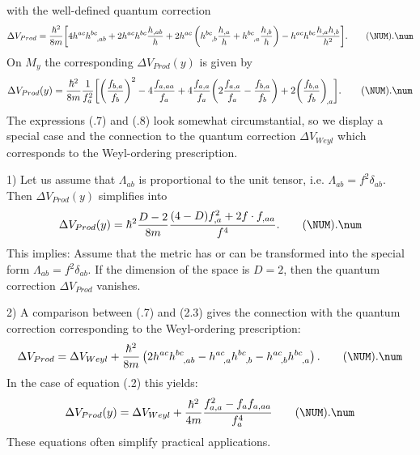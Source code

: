 with the well-defined quantum correction
\plus
$$\Delta V_{Prod}={\hbar^2\over8m}\bigg[ 4h^{ac}h^{bc}_{\ \ ,ab}
  +2h^{ac}h^{bc}{h_{,ab}\over h}
  +2h^{ac}\left(h^{bc}_{\ \ ,b}{h_{,a}\over h}
  +h^{bc}_{\ \ ,a}{h_{,b}\over h}\right)
  -h^{ac}h^{bc}{h_{,a}h_{,b}\over h^2}\bigg].
  \tag\NUM.\num$$
On $M_y$ the corresponding $\Delta V_{Prod}(y)$ is given by
\plus
$$\Delta V_{Prod}(y)={\hbar^2\over8m}{1\over f_a^2}
  \bigg[\bigg({f_{b,a}\over f_b}\bigg)^2-4{f_{a,aa}\over f_a}
  +4{f_{a,a}\over f_a}\bigg(2{f_{a,a}\over f_a}
  -{f_{b,a}\over f_b}\bigg)
  +2\bigg({f_{b,a}\over f_b}\bigg)_{\!,a}\bigg].
  \tag\NUM.\num$$
The expressions (\NUM.7) and (\NUM.8) look somewhat circumstantial,
so we display a special case and the connection to the quantum
correction $\Delta V_{Weyl}$ which corresponds to the Weyl-ordering
prescription.
\item{1)} Let us assume that $\Lambda_{ab}$ is proportional to the
         unit tensor, i.e. $\Lambda_{ab}=f^2\delta_{ab}$.
         Then $\Delta V_{Prod}(y)$ simplifies into
\plus
$$\Delta V_{Prod}(y)=\hbar^2{D-2\over8m}
         {(4-D)f_{,a}^2+2f\cdot f_{,aa}\over f^4}.
  \tag\NUM.\num$$
     This implies: Assume that the metric has or can be transformed into
     the special form $\Lambda_{ab}=f^2\delta_{ab}$. If the dimension
     of the space is $D=2$, then the quantum correction $\Delta
     V_{Prod}$ vanishes.
\item{2)}
     A comparison between (\NUM.7) and (2.3) gives the connection with
     the quantum correction corresponding to the Weyl-ordering
     prescription:
\plus
$$\Delta V_{Prod}=\Delta V_{Weyl}+{\hbar^2\over8m}
          \left( 2h^{ac}h^{bc}_{\ \ ,ab}-h^{ac}_{\ \ ,a}h^{bc}_{\ \ ,b}
                  -h^{ac}_{\ \ ,b}h^{bc}_{\ \ ,a}\right).
  \tag\NUM.\num$$
In the case of equation (\NUM.2) this yields:
\plus
$$\Delta V_{Prod}(y)=\Delta V_{Weyl}
   +{\hbar^2\over4m}{f_{a,a}^2-f_a f_{a,aa}\over f_a^4}
  \tag\NUM.\num$$
These equations often simplify practical applications.

